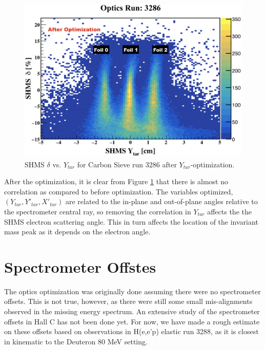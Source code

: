 \documentclass[11pt]{article}
\begin{document}
\begin{figure}[h!]
  \centering
  \includegraphics[scale=0.4]{plots/SHMS_delta_vs_ytar_3286_afterOptim.png}
  \caption{SHMS $\delta$ vs. $Y_{tar}$ for Carbon Sieve run 3286 after $Y_{tar}$-optimization.}
  \label{fig:shmsYtar_afterOptim}
\end{figure}
After the optimization, it is clear from Figure \ref{fig:shmsYtar_afterOptim} that there is almost no
correlation as compared to before optimization. The variables optimized, $(Y_{tar}, Y'_{tar}, X'_{tar})$ are
related to the in-plane and out-of-plane angles relative to the spectrometer central ray, so removing the correlation
in $Y_{tar}$ affects the the SHMS electron scattering angle. This in turn affects the location of the invariant mass peak as it depends
on the electron angle.
\section{Spectrometer Offstes} \label{sec:spec_off_sec}
\noindent The optics optimization was originally done assuming there were no spectrometer offsets. This is not true,
however, as there were still some small mis-alignments observed in the missing energy spectrum. An extensive study
of the spectrometer offsets in Hall C has not been done yet. For now, we have made a rough estimate on these
offsets based on observations in H(e,e'p) elastic run 3288, as it is closest in kinematic to the Deuteron 80 MeV setting.
\end{document}
